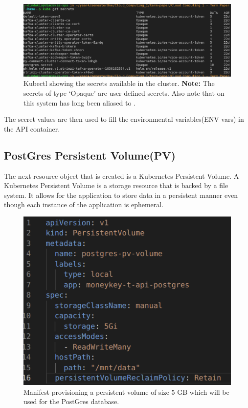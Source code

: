\begin{flushleft}
\begin{figure} [ht]
\begin{center}
            \includegraphics[width=1\textwidth]{figures/kube-get-secrets.png}
            \caption{Kubectl showing the secrets available in the cluster. \newline \textbf{Note:} The secrets of type `Opaque' are user defined secrets. Also note that on this
                system  has long been aliased to .}
            \label{fig: 2.6}
        \end{center}
    \end{figure}
    \newline The secret values are then used to fill the environmental variables(ENV vars) in the API container.
    \bigbreak
    \subsection{PostGres Persistent Volume(PV)}
    The next resource object that is created is a Kubernetes Persistent Volume. A Kubernetes Persistent Volume is a storage resource that is backed by a file system. It allows for the
    application to store data in a persistent manner even though each instance of the application is ephemeral. \newline
    \begin{figure} [ht]
        \begin{center}
            \includegraphics[width=.4\textwidth]{figures/postgres-pv.png}
            \caption{Manifest provisioning a persistent volume of size 5 GB which will be used for the PostGres database.}
            \label{fig: 2.7}
        \end{center}
    \end{figure}

\end{flushleft}
